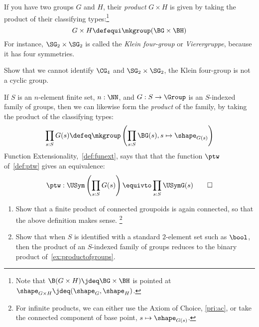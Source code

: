 \begin{example}\label{ex:productofgroups}
  If you have two groups $G$ and $H$,
  their \emph{product} $G\times H$ is given by taking
  the product of their classifying types:\footnote{%
    Note that $\B(G\times H)\jdeq \BG\times \BH$ is pointed at
  $\shape_{G\times H}\jdeq(\shape_G,\shape_H)$.}
  \[
    G\times H\defequi \mkgroup(\BG\times\BH)
  \]
  For instance, $\SG_2\times\SG_2$ is called the
  \emph{Klein four-group} or \emph{Vierergruppe}, because
  it has four symmetries.
\end{example}

\begin{xca}\label{xca:klein-not-cyclic}
  Show that we cannot identify $\CG_4$ and $\SG_2\times\SG_2$,
  \ie the Klein four-group is not a cyclic group.
\end{xca}

\begin{example}\label{ex:bigproductofgroups}
  If $S$ is an $n$-element finite set, $n : \NN$,
  and $G : S \to \Group$ is an $S$-indexed family of groups,
  then we can likewise form the \emph{product} of the family,
  by taking the product of the classifying types:
  \[
    \prod_{s:S}G(s) \defeq
    \mkgroup\left(\prod_{s:S}\BG(s),s\mapsto \shape_{G(s)}\right)
  \]
  Function Extensionality,~\cref{def:funext}, says
  that that the function $\ptw$ of~\cref{def:ptw}
  gives an equivalence:
  \[
    \ptw : \USym\left(\prod_{s:S}G(s)\right)
    \equivto
    \prod_{s:S}\USymG(s)\qedhere
  \]
\end{example}

\begin{xca}\label{xca:bigproductfunext}
  \begin{enumerate}
  \item\label{it:bigproductfunext-i}
    Show that a finite product of connected groupoids
    is again connected, so that the above definition makes sense.%
    \footnote{For infinite products,
      we can either use the Axiom of Choice, \cref{pri:ac},
      or take the connected component of base point,
      $s \mapsto \shape_{G(s)}$.}
  \item
    Show that when $S$ is identified with a standard $2$-element set
    such as $\bool$, then the product of an $S$-indexed family
    of groups reduces to the binary product of~\cref{ex:productofgroups}.\qedhere
  \end{enumerate}
\end{xca}


